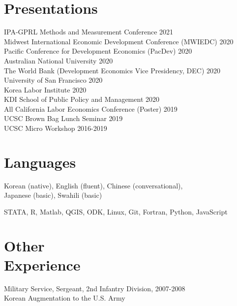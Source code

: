 \documentclass[letterpaper, margin, 10pt]{res} %
\newcommand{\blank}[1]{\hspace*{#1}\linebreak[0]}
\begin{document}
\begin{resume}
\section{Presentations}
IPA-GPRL Methods and Measurement Conference  \hfill{2021}\\
Midwest International Economic Development Conference (MWIEDC)  \hfill{2020}\\
Pacific Conference for Development Economics (PacDev) \hfill{2020}\\
Australian National University \hfill{2020}\\
The World Bank (Development Economics Vice Presidency, DEC) \hfill{2020}\\
University of San Francisco \hfill{2020}\\
Korea Labor Institute \hfill{2020}\\
KDI School of Public Policy and Management \hfill{2020}\\
All California Labor Economics Conference (Poster)   \hfill{2019}\\
UCSC Brown Bag Lunch Seminar  \hfill{2019}\\
UCSC Micro Workshop \hfill{2016-2019}



\section{\sc \textbf{Languages}}
Korean (native), English (fluent), Chinese (conversational), \\ Japanese (basic), Swahili (basic)

STATA, R, Matlab, QGIS, ODK, Linux, Git, Fortran, Python, JavaScript

\section{\sc \textbf{Other \\ Experience}}
Military Service, Sergeant, 2nd Infantry Division, \hfill{2007-2008} \\
\blank{0.5cm} Korean Augmentation to the U.S. Army


\end{resume}
\end{document}
